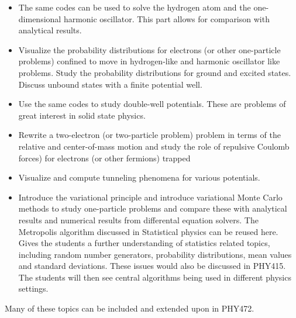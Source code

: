 \documentclass[%
oneside,                 %
final,                   %
10pt]{article}
\begin{document}
\begin{itemize}
  \item The same codes can be used to solve the hydrogen atom and the one-dimensional harmonic oscillator. This part allows for comparison with analytical results. 

  \item Visualize the probability distributions for electrons (or other one-particle problems) confined to move in hydrogen-like and harmonic oscillator like problems. Study the probability distributions for ground and excited states. Discuss unbound states with a finite potential well.

  \item Use the same codes to study double-well potentials. These are problems of great interest in solid state physics.

  \item Rewrite a two-electron (or two-particle problem) problem in terms of the relative and center-of-mass motion and study the role of repulsive Coulomb forces) for electrons (or other fermions) trapped 

  \item Visualize and compute tunneling phenomena for various potentials.

  \item Introduce the  variational principle and introduce variational Monte Carlo methods to study one-particle problems and compare these with analytical results and numerical results from differental equation solvers.  The Metropolis algorithm discussed in Statistical physics can be reused here. Gives the students a further understanding of statistics related topics, including random number generators, probability distributions, mean values and standard deviations. These issues would also be discussed in PHY415. The students will then see central algorithms being used in different physics settings.
\end{itemize}

\noindent
Many of these topics can be included and extended upon in PHY472. 
\end{document}
